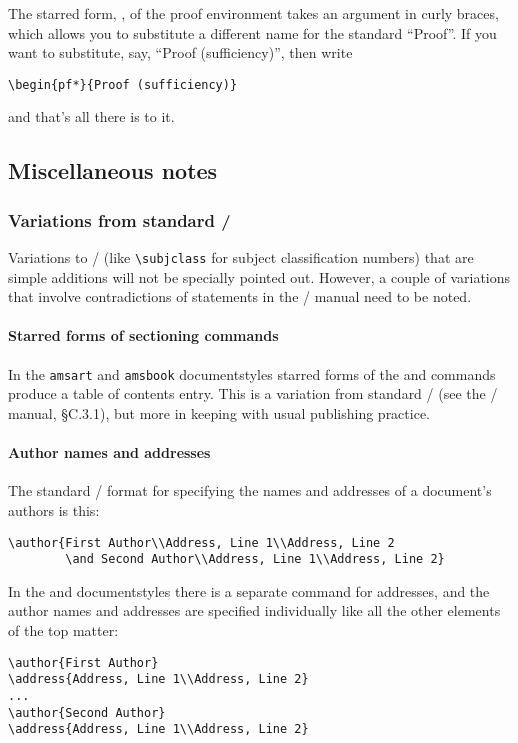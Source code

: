 The starred form, , of the proof environment takes an
argument in curly braces, which allows you to
substitute a different name for the standard ``Proof''.
If you want to substitute, say, ``Proof (sufficiency)'', then write
\begin{verbatim}
\begin{pf*}{Proof (sufficiency)}
\end{verbatim}
and that's all there is to it.

\subsection{Miscellaneous notes}
\subsubsection{Variations from standard \latex/}
\label{sss:variations}

Variations to \latex/ (like \verb=\subjclass= for subject
classification numbers) that are simple additions will not be
specially pointed out. However, a couple of variations that involve
contradictions of statements in the \latex/ manual need to be noted.

\paragraph{Starred forms of sectioning commands}
In the {\tt amsart} and {\tt amsbook} documentstyles starred forms of
the  and  commands produce a table of contents
entry.  This is a variation from standard \latex/
(see the \latex/ manual, \S C.3.1), but more in keeping with
usual publishing practice.

\paragraph{Author names and addresses}
The standard \latex/ format for specifying the names and addresses
 of a document's authors is this:
\begin{verbatim}
\author{First Author\\Address, Line 1\\Address, Line 2
        \and Second Author\\Address, Line 1\\Address, Line 2}
\end{verbatim}
In the  and  documentstyles
there is a separate
 command for addresses, and the author names and addresses are
specified individually like all the other elements of the
top matter:
\begin{verbatim}
\author{First Author}
\address{Address, Line 1\\Address, Line 2}
...
\author{Second Author}
\address{Address, Line 1\\Address, Line 2}
\end{verbatim}

